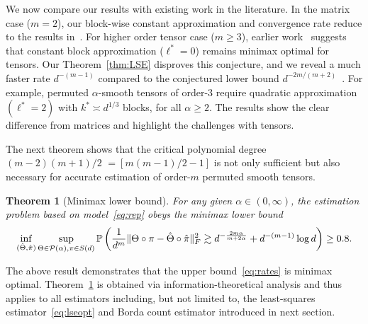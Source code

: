 \documentclass{article}
\newtheorem{thm}{Theorem}
\theoremstyle{definition}
\begin{document}
We now compare our results with existing work in the literature. %
In the matrix case ($m=2$), our block-wise constant approximation and convergence rate reduce to the results in~\cite{klopp2017oracle}. For higher order tensor case ($m\geq 3$), earlier work~\citep{balasubramanian2021nonparametric} suggests that constant block approximation ($\ell^*=0$) remains minimax optimal for tensors. 
Our Theorem~\ref{thm:LSE} disproves this conjecture, and we reveal a much faster rate $d^{-(m-1)}$ compared to the conjectured lower bound $d^{-2m/( m+2)}$~\citep{balasubramanian2021nonparametric}. For example, permuted $\alpha$-smooth tensors of order-3 require quadratic approximation $(\ell^*=2)$ with $k^*\asymp d^{1/3}$ blocks, for all $\alpha\geq 2$. The results show the clear difference from matrices and highlight the challenges with tensors. 

The next theorem shows that the critical polynomial degree $(m-2)(m+1)/2$ $=[m(m-1)/2-1]$ is not only sufficient but also necessary for accurate estimation of order-$m$ permuted smooth tensors. 

\begin{thm}[Minimax lower bound]\label{thm:minimax} For any given $\alpha\in(0,\infty)$, the estimation problem based on model~\eqref{eq:rep} obeys the minimax lower bound 
\begin{equation}\label{eq:minimax}
\inf_{(\hat \Theta,\hat \pi)}\sup_{\Theta\in \mathcal{P}(\alpha), \pi\in S(d)} \mathbb{P}\left({1\over d^m}\lVert\Theta\circ \pi-\hat \Theta\circ \hat \pi\rVert_F^2 \gtrsim d^{-{2m\alpha\over m+2\alpha}}+d^{-(m-1)}\log d \right) \geq 0.8.
\end{equation}
\end{thm}
The above result demonstrates that the upper bound~\eqref{eq:rates} is minimax optimal. Theorem~\ref{thm:minimax} is obtained via information-theoretical analysis and thus applies to all estimators including, but not limited to, the least-squares estimator~\eqref{eq:lseopt} and Borda count estimator introduced in next section. 
\end{document}
